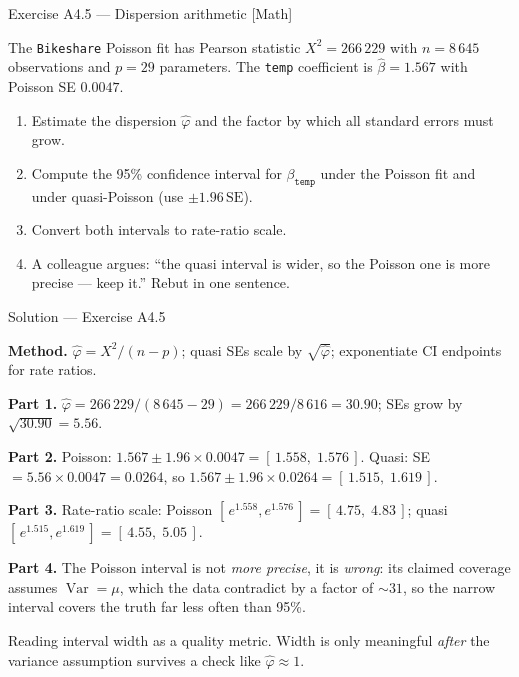 \documentclass[aspectratio=169,11pt]{beamer}
\begin{document}
\begin{frame}{Exercise A4.5 --- Dispersion arithmetic [Math]}
\begin{exercise}
  The \texttt{Bikeshare} Poisson fit has Pearson statistic $X^2 = 266\,229$ with
  $n = 8\,645$ observations and $p = 29$ parameters. The \texttt{temp} coefficient is
  $\hat\beta = 1.567$ with Poisson SE $0.0047$.
  \begin{enumerate}
    \item Estimate the dispersion $\hat\varphi$ and the factor by which all standard
          errors must grow.
    \item Compute the 95\% confidence interval for $\beta_{\texttt{temp}}$ under the
          Poisson fit and under quasi-Poisson (use $\pm 1.96\,\text{SE}$).
    \item Convert both intervals to rate-ratio scale.
    \item A colleague argues: ``the quasi interval is wider, so the Poisson one is more
          precise --- keep it.'' Rebut in one sentence.
  \end{enumerate}
\end{exercise}
\end{frame}

\begin{frame}{Solution --- Exercise A4.5}
\begin{solutionbox}
  \textbf{Method.} $\hat\varphi = X^2/(n-p)$; quasi SEs scale by $\sqrt{\hat\varphi}$;
  exponentiate CI endpoints for rate ratios.

  \textbf{Part 1.} $\hat\varphi = 266\,229 / (8\,645 - 29) = 266\,229/8\,616 =
  \mathbf{30.90}$; SEs grow by $\sqrt{30.90} = \mathbf{5.56}$.

  \textbf{Part 2.} Poisson: $1.567 \pm 1.96 \times 0.0047 = [\,1.558,\; 1.576\,]$.
  Quasi: SE $= 5.56\times 0.0047 = 0.0264$, so
  $1.567 \pm 1.96\times 0.0264 = [\,1.515,\; 1.619\,]$.

  \textbf{Part 3.} Rate-ratio scale: Poisson $[\,e^{1.558}, e^{1.576}\,] =
  [\,4.75,\; 4.83\,]$; quasi $[\,e^{1.515}, e^{1.619}\,] = [\,4.55,\; 5.05\,]$.

  \textbf{Part 4.} The Poisson interval is not \emph{more precise}, it is
  \emph{wrong}: its claimed coverage assumes $\operatorname{Var}=\mu$, which the data
  contradict by a factor of $\sim\!31$, so the narrow interval covers the truth far
  less often than 95\%.
\end{solutionbox}
\begin{mistake}
  Reading interval width as a quality metric. Width is only meaningful \emph{after} the
  variance assumption survives a check like $\hat\varphi \approx 1$.
\end{mistake}
\end{frame}
\end{document}
